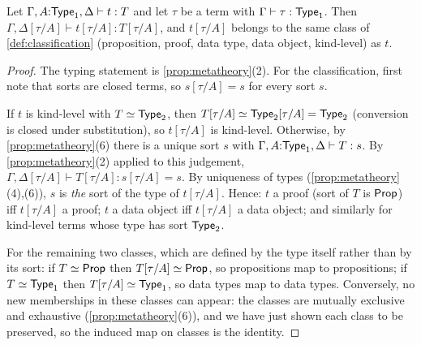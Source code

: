 \begin{lemma}
\label{lem:sort-invariance}
Let $\Gamma, A{:}\mathsf{Type}_1, \Delta \vdash t : T$ and let $\tau$ be a
term with $\Gamma \vdash \tau : \mathsf{Type}_1$.  Then
$\Gamma, \Delta[\tau/A] \vdash t[\tau/A] : T[\tau/A]$, and $t[\tau/A]$
belongs to the same class of \cref{def:classification} (proposition,
proof, data type, data object, kind-level) as $t$.
\end{lemma}

\begin{proof}
The typing statement is \cref{prop:metatheory}(2).  For the
classification, first note that sorts are closed terms, so $s[\tau/A]
= s$ for every sort $s$.

If $t$ is kind-level with $T \simeq \mathsf{Type}_2$, then $T[\tau/A] \simeq
\mathsf{Type}_2[\tau/A] = \mathsf{Type}_2$ (conversion is closed under
substitution), so $t[\tau/A]$ is kind-level.  Otherwise, by
\cref{prop:metatheory}(6) there is a unique sort $s$ with $\Gamma,
A{:}\mathsf{Type}_1, \Delta \vdash T : s$.  By \cref{prop:metatheory}(2)
applied to this judgement, $\Gamma, \Delta[\tau/A] \vdash T[\tau/A] :
s[\tau/A] = s$.  By uniqueness of types
(\cref{prop:metatheory}(4),(6)), $s$ is \emph{the} sort of the type
of $t[\tau/A]$.  Hence: $t$ a proof (sort of $T$ is $\mathsf{Prop}$) iff
$t[\tau/A]$ a proof; $t$ a data object iff $t[\tau/A]$ a data
object; and similarly for kind-level terms whose type has sort
$\mathsf{Type}_2$.

For the remaining two classes, which are defined by the type itself
rather than by its sort: if $T \simeq \mathsf{Prop}$ then $T[\tau/A] \simeq
\mathsf{Prop}$, so propositions map to propositions; if $T \simeq \mathsf{Type}_1$
then $T[\tau/A] \simeq \mathsf{Type}_1$, so data types map to data types.
Conversely, no new memberships in these classes can appear: the
classes are mutually exclusive and exhaustive
(\cref{prop:metatheory}(6)), and we have just shown each class to be
preserved, so the induced map on classes is the identity.
\end{proof}


